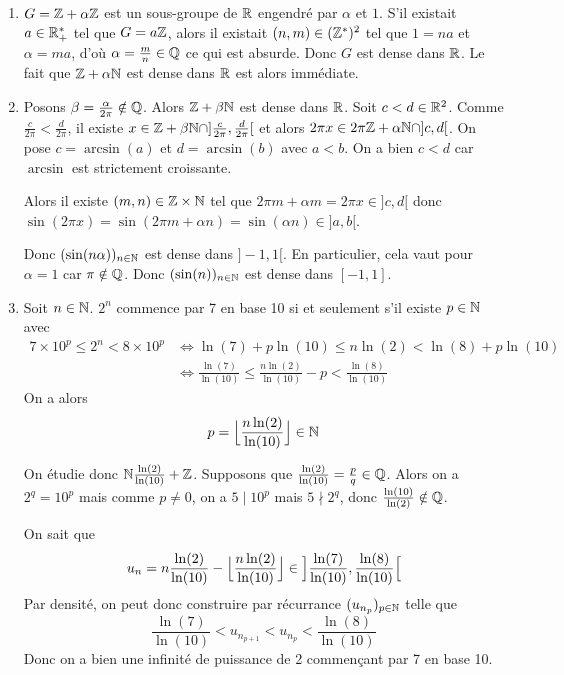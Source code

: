 \begin{solution}
	\phantom{}
	\begin{enumerate}
		\item $G=\mathbb{Z}+\alpha\mathbb{Z}$ est un sous-groupe de $\mathbb{R}$ engendré par $\alpha$ et $1$. S'il existait $a\in\mathbb{R}_{+}^{*}$ tel que $G=a\mathbb{Z}$, alors il existait $(n,m)\in(\mathbb{Z}^{*})^{2}$ tel que $1=na$ et $\alpha=ma$, d'où $\alpha=\frac{m}{n}\in\mathbb{Q}$ ce qui est absurde. Donc $G$ est dense dans $\mathbb{R}$. Le fait que $\mathbb{Z}+\alpha\mathbb{N}$ est dense dans $\mathbb{R}$ est alors immédiate.
		\item Posons $\beta=\frac{\alpha}{2\pi}\notin\mathbb{Q}$. Alors $\mathbb{Z}+\beta\mathbb{N}$ est dense dans $\mathbb{R}$. Soit $c<d\in\mathbb{R}^{2}$. Comme $\frac{c}{2\pi}<\frac{d}{2\pi}$, il existe $x\in\mathbb{Z}+\beta\mathbb{N}\cap]\frac{c}{2\pi},\frac{d}{2\pi}[$ et alors $2\pi x\in2\pi\mathbb{Z}+\alpha\mathbb{N}\cap]c,d[$. On pose $c=\arcsin(a)$ et $d=\arcsin(b)$ avec $a<b$. On a bien $c<d$ car $\arcsin$ est strictement croissante.
		
		Alors il existe $(m,n)\in\mathbb{Z}\times\mathbb{N}$ tel que $2\pi m+\alpha m=2\pi x\in]c,d[$ donc $\sin(2\pi x)=\sin(2\pi m+\alpha n)=\sin(\alpha n)\in]a,b[$.

		Donc $(\sin(n\alpha))_{n\in\mathbb{N}}$ est dense dans $]-1,1[$. En particulier, cela vaut pour $\alpha=1$ car $\pi\notin\mathbb{Q}$. Donc $(\sin(n))_{n\in\mathbb{N}}$ est dense dans $[-1,1]$.

		\item Soit $n\in\mathbb{N}$. $2^{n}$ commence par 7 en base 10 si et seulement s'il existe $p\in\mathbb{N}$ avec 
		\begin{align*}
			7\times10^{p}\leqslant2^{n}<8\times10^{p}
			&\Longleftrightarrow \ln(7)+p\ln(10)\leqslant n\ln(2)<\ln(8)+p\ln(10)\\
			&\Longleftrightarrow \frac{\ln(7)}{\ln(10)}\leqslant\frac{n\ln(2)}{\ln(10)}-p<\frac{\ln(8)}{\ln(10)}
		\end{align*}
		On a alors 
		$$p=\Bigl\lfloor\frac{n\ln(2)}{\ln(10)}\Bigr\rfloor\in\mathbb{N}$$

		On étudie donc $\mathbb{N}\frac{\ln(2)}{\ln(10)}+\mathbb{Z}$. Supposons que $\frac{\ln(2)}{\ln(10)}=\frac{p}{q}\in\mathbb{Q}$. Alors on a $2^{q}=10^{p}$ mais comme $p\neq0$, on a $5\mid 10^{p}$ mais $5\nmid 2^{q}$, donc $\frac{\ln(10)}{\ln(2)}\notin\mathbb{Q}$.

		On sait que 
		$$u_{n}=n\frac{\ln(2)}{\ln(10)}-\Bigl\lfloor\frac{n\ln(2)}{\ln(10)}\Bigr\rfloor\in\Bigl]\frac{\ln(7)}{\ln(10)},\frac{\ln(8)}{\ln(10)}\Bigr[$$
		Par densité, on peut donc construire par récurrance $(u_{n_{p}})_{p\in\mathbb{N}}$ telle que 
		$$\frac{\ln(7)}{\ln(10)}<u_{n_{p+1}}<u_{n_{p}}<\frac{\ln(8)}{\ln(10)}$$
		Donc on a bien une infinité de puissance de 2 commençant par 7 en base 10.
	\end{enumerate}
\end{solution}

